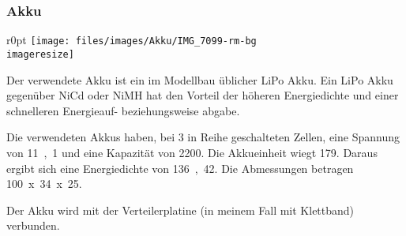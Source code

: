 \subsubsection{Akku}
\begin{wrapfigure}{r}{0pt}
	\texttt{[image: files/images/Akku/IMG\_7099-rm-bg\\imageresize]}
\end{wrapfigure}

Der verwendete Akku ist ein im Modellbau
üblicher \ac{LiPo} Akku.
Ein \ac{LiPo} Akku gegenüber \ac{NiCd} oder \ac{NiMH}
hat den Vorteil der höheren Energiedichte
und einer schnelleren Energieauf-
beziehungsweise abgabe.

Die verwendeten Akkus haben, bei 3 in Reihe geschalteten Zellen,
eine Spannung von \unit{11{,}1}{\volt} und eine Kapazität von \unit{2200}{\milli\ampere\hour}.
Die Akkueinheit wiegt \unit{179}{\gram}.
Daraus ergibt sich eine Energiedichte von \unit{136{,}42}{\watt\hour\per\kilogram}.
Die Abmessungen betragen \unit{100 x 34 x 25}{\milli\metre}.

Der Akku wird mit der Verteilerplatine (in meinem Fall mit Klettband) verbunden.
